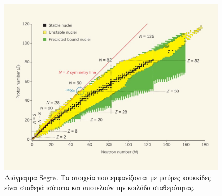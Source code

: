 \begin{figure}
    \centering
    \includegraphics[scale=0.3]{Figures/Nuclei-as-function-of-N-Z.jpg} 
     \caption{Διάγραμμα Segre. Τα στοιχεία που εμφανίζονται με μαύρες κουκκίδες είναι σταθερά ισότοπα και αποτελούν την κοιλάδα σταθερότητας.} 
     \label{fig:segre_diagram}
\end{figure}
